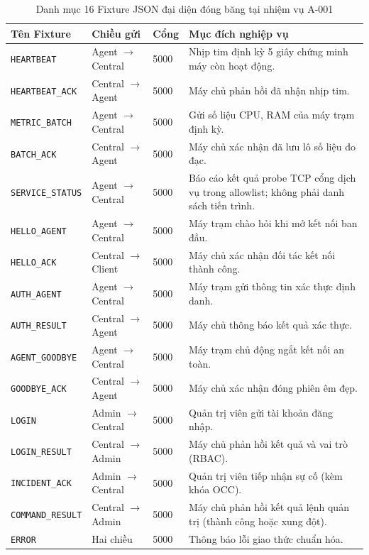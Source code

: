 \documentclass[12pt,a4paper]{article}
\begin{document}
\begin{table}[H]
  \centering
  \caption{Danh mục 16 Fixture JSON đại diện đóng băng tại nhiệm vụ A-001}
  \label{tab:16_message_fixtures}
  \small
  \begin{tabularx}{\textwidth}{|l|l|l|X|}
    \hline
    \rowcolor{lgDeepBlue}
    \color{white}\textbf{Tên Fixture} & \color{white}\textbf{Chiều gửi} & \color{white}\textbf{Cổng} & \color{white}\textbf{Mục đích nghiệp vụ} \\
    \hline
    \texttt{HEARTBEAT} & Agent $\rightarrow$ Central & 5000 & Nhịp tim định kỳ 5 giây chứng minh máy còn hoạt động. \\
    \hline
    \texttt{HEARTBEAT\_ACK} & Central $\rightarrow$ Agent & 5000 & Máy chủ phản hồi đã nhận nhịp tim. \\
    \hline
    \texttt{METRIC\_BATCH} & Agent $\rightarrow$ Central & 5000 & Gửi số liệu CPU, RAM của máy trạm định kỳ. \\
    \hline
    \texttt{BATCH\_ACK} & Central $\rightarrow$ Agent & 5000 & Máy chủ xác nhận đã lưu lô số liệu đo đạc. \\
    \hline
    \texttt{SERVICE\_STATUS} & Agent $\rightarrow$ Central & 5000 & Báo cáo kết quả probe TCP cổng dịch vụ trong allowlist; không phải danh sách tiến trình. \\
    \hline
    \texttt{HELLO\_AGENT} & Agent $\rightarrow$ Central & 5000 & Máy trạm chào hỏi khi mở kết nối ban đầu. \\
    \hline
    \texttt{HELLO\_ACK} & Central $\rightarrow$ Client & 5000 & Máy chủ xác nhận đối tác kết nối thành công. \\
    \hline
    \texttt{AUTH\_AGENT} & Agent $\rightarrow$ Central & 5000 & Máy trạm gửi thông tin xác thực định danh. \\
    \hline
    \texttt{AUTH\_RESULT} & Central $\rightarrow$ Agent & 5000 & Máy chủ thông báo kết quả xác thực. \\
    \hline
    \texttt{AGENT\_GOODBYE} & Agent $\rightarrow$ Central & 5000 & Máy trạm chủ động ngắt kết nối an toàn. \\
    \hline
    \texttt{GOODBYE\_ACK} & Central $\rightarrow$ Agent & 5000 & Máy chủ xác nhận đóng phiên êm đẹp. \\
    \hline
    \texttt{LOGIN} & Admin $\rightarrow$ Central & 5000 & Quản trị viên gửi tài khoản đăng nhập. \\
    \hline
    \texttt{LOGIN\_RESULT} & Central $\rightarrow$ Admin & 5000 & Máy chủ phản hồi kết quả và vai trò (RBAC). \\
    \hline
    \texttt{INCIDENT\_ACK} & Admin $\rightarrow$ Central & 5000 & Quản trị viên tiếp nhận sự cố (kèm khóa OCC). \\
    \hline
    \texttt{COMMAND\_RESULT} & Central $\rightarrow$ Admin & 5000 & Máy chủ phản hồi kết quả lệnh quản trị (thành công hoặc xung đột). \\
    \hline
    \texttt{ERROR} & Hai chiều & 5000 & Thông báo lỗi giao thức chuẩn hóa. \\
    \hline
  \end{tabularx}
\end{table}
\end{document}
